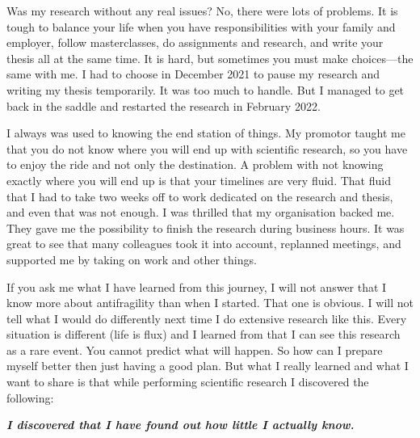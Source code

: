 Was my research without any real issues? No, there were lots of problems. It is tough to balance your life when you have responsibilities with your family and employer, follow masterclasses, do assignments and research, and write your thesis all at the same time. It is hard, but sometimes you must make choices—the same with me. I had to choose in December 2021 to pause my research and writing my thesis temporarily. It was too much to handle. But I managed to get back in the saddle and restarted the research in February 2022.

I always was used to knowing the end station of things. My promotor taught me that you do not know where you will end up with scientific research, so you have to enjoy the ride and not only the destination. A problem with not knowing exactly where you will end up is that your timelines are very fluid. That fluid that I had to take two weeks off to work dedicated on the research and thesis, and even that was not enough. I was thrilled that my organisation backed me. They gave me the possibility to finish the research during business hours. It was great to see that many colleagues took it into account, replanned meetings, and supported me by taking on work and other things. 

If you ask me what I have learned from this journey, I will not answer that I know more about \gls{antifragility} than when I started. That one is obvious. I will  not tell what I would do differently next time I do extensive research like this. Every situation is different (life is flux) and I learned from \textcite{Taleb2012} that I can see this research as a rare event. You cannot predict what will happen. So how can I prepare myself better then just having a good plan. But what I really learned and what I want to share is that while performing scientific research I discovered the following:\\

\vspace{\baselineskip}
\begin{center}
\noindent \textit{\textbf{I discovered that I have found out how little I actually know.}}
\end{center}